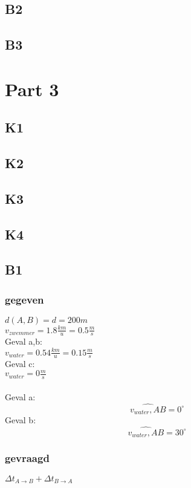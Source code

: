 \documentclass[10pt,a4paper]{article}
\begin{document}
\subsection{B2}

\subsection{B3}

\section{Part 3}
\subsection{K1}

\subsection{K2}

\subsection{K3}

\subsection{K4}

\subsection{B1}
\subsubsection*{gegeven}
$d(A,B) = d = 200m$\\
$v_{zwemmer}=1.8\frac{km}{u}=0.5\frac{m}{s}$\\
Geval a,b:\\
$v_{water}= 0.54\frac{km}{u}=0.15\frac{m}{s}$\\
Geval c:\\
$v_{water}= 0\frac{m}{s}$\\\\
Geval a: \[\widehat{v_{water},AB} = 0^\circ\]
Geval b: \[\widehat{v_{water},AB} = 30^\circ\]

\subsubsection*{gevraagd}
$\Delta t_{A\rightarrow B} + \Delta t_{B\rightarrow A}$
\end{document}
